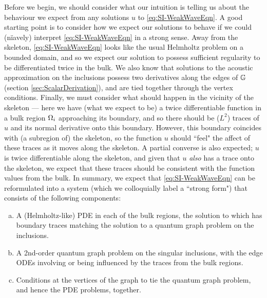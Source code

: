 Before we begin, we should consider what our intuition is telling us about the behaviour we expect from any solutions $u$ to \eqref{eq:SI-WeakWaveEqn}.
A good starting point is to consider how we expect our solutions to behave if we could (n\"{i}avely) interpret \eqref{eq:SI-WeakWaveEqn} in a strong sense.
Away from the skeleton, \eqref{eq:SI-WeakWaveEqn} looks like the usual Helmholtz problem on a bounded domain, and so we expect our solution to possess sufficient regularity to be differentiated twice in the bulk.
We also know that solutions to the acoustic approximation on the inclusions possess two derivatives along the edges of $\mathbb{G}$ (section \ref{sec:ScalarDerivation}), and are tied together through the vertex conditions.
Finally, we must consider what should happen in the vicinity of the skeleton --- here we have (what we expect to be) a twice differentiable function in a bulk region $\Omega_i$ approaching its boundary, and so there should be ($L^2$) traces of $u$ and its normal derivative onto this boundary.
However, this boundary coincides with (a subregion of) the skeleton, so the function $u$ should ``feel" the affect of these traces as it moves along the skeleton.
A partial converse is also expected; $u$ is twice differentiable along the skeleton, and given that $u$ \emph{also} has a trace onto the skeleton, we expect that these traces should be consistent with the function values from the bulk.
In summary, we expect that \eqref{eq:SI-WeakWaveEqn} can be reformulated into a system (which we colloquially label a ``strong form") that consists of the following components:
\begin{enumerate}[(a)]
	\item A (Helmholtz-like) PDE in each of the bulk regions, the solution to which has boundary traces matching the solution to a quantum graph problem on the inclusions.
	\item A 2nd-order quantum graph problem on the singular inclusions, with the edge ODEs involving or being influenced by the traces from the bulk regions.
	\item Conditions at the vertices of the graph to tie the quantum graph problem, and hence the PDE problems, together.
\end{enumerate}

